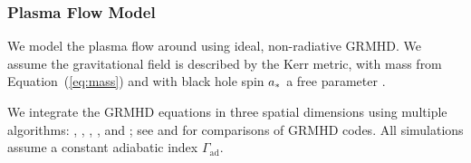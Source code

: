 \subsubsection{Plasma Flow Model}

We model the plasma flow around \sgra using ideal, non-radiative GRMHD.  We assume the gravitational field
is described by the Kerr metric, with mass from Equation~(\ref{eq:mass}) and with black hole spin $a_*$ a free parameter \citep[see e.g.,][]{2003ApJ...589..444G, 2005ApJ...635..723A, 2007A&A...473...11D}.

We integrate the GRMHD equations in three spatial dimensions using multiple algorithms:
\kharma   \citep{2021JOSS....6.3336P},
\bhac     \citep{2017ComAC...4....1P},
\hamr     \citep{Liska2019},
\koral    \citep{2013MNRAS.429.3533S}, and
\athenapp \citep{2016ApJS..225...22W};
see \citet{2019ApJS..243...26P} and \citet{Olivares_et_al} for comparisons of GRMHD codes.
All simulations assume a constant adiabatic index  $\Gamma_\mathrm{ad}$. 

